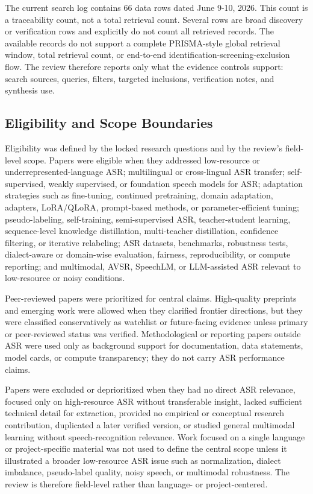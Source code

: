 \documentclass[pdflatex,sn-basic]{sn-jnl}
\theoremstyle{thmstyleone}
\theoremstyle{thmstyletwo}
\theoremstyle{thmstylethree}
\begin{document}
The current search log contains 66 data rows dated June 9-10, 2026. This count is a traceability count, not a total retrieval count. Several rows are broad discovery or verification rows and explicitly do not count all retrieved records. The available records do not support a complete PRISMA-style global retrieval window, total retrieval count, or end-to-end identification-screening-exclusion flow. The review therefore reports only what the evidence controls support: search sources, queries, filters, targeted inclusions, verification notes, and synthesis use.

\subsection{Eligibility and Scope Boundaries}

Eligibility was defined by the locked research questions and by the review's field-level scope. Papers were eligible when they addressed low-resource or underrepresented-language ASR; multilingual or cross-lingual ASR transfer; self-supervised, weakly supervised, or foundation speech models for ASR; adaptation strategies such as fine-tuning, continued pretraining, domain adaptation, adapters, LoRA/QLoRA, prompt-based methods, or parameter-efficient tuning; pseudo-labeling, self-training, semi-supervised ASR, teacher-student learning, sequence-level knowledge distillation, multi-teacher distillation, confidence filtering, or iterative relabeling; ASR datasets, benchmarks, robustness tests, dialect-aware or domain-wise evaluation, fairness, reproducibility, or compute reporting; and multimodal, AVSR, SpeechLM, or LLM-assisted ASR relevant to low-resource or noisy conditions.

Peer-reviewed papers were prioritized for central claims. High-quality preprints and emerging work were allowed when they clarified frontier directions, but they were classified conservatively as watchlist or future-facing evidence unless primary or peer-reviewed status was verified. Methodological or reporting papers outside ASR were used only as background support for documentation, data statements, model cards, or compute transparency; they do not carry ASR performance claims.

Papers were excluded or deprioritized when they had no direct ASR relevance, focused only on high-resource ASR without transferable insight, lacked sufficient technical detail for extraction, provided no empirical or conceptual research contribution, duplicated a later verified version, or studied general multimodal learning without speech-recognition relevance. Work focused on a single language or project-specific material was not used to define the central scope unless it illustrated a broader low-resource ASR issue such as normalization, dialect imbalance, pseudo-label quality, noisy speech, or multimodal robustness. The review is therefore field-level rather than language- or project-centered.
\end{document}
